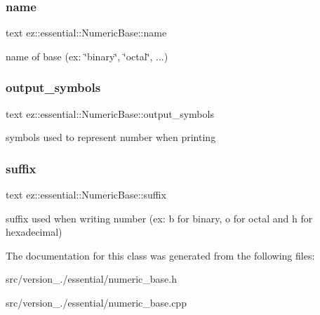 \subsubsection{\texorpdfstring{name}{name}}
{\footnotesize\ttfamily text ez\+::essential\+::\+Numeric\+Base\+::name}

name of base (ex\+: \char`\"{}binary\char`\"{}, \char`\"{}octal\char`\"{}, ...) \mbox{\label{classez_1_1essential_1_1NumericBase_a42db2f729893765e4e9a5a1085085e5d}} 
\subsubsection{\texorpdfstring{output\+\_\+symbols}{output\_symbols}}
{\footnotesize\ttfamily text ez\+::essential\+::\+Numeric\+Base\+::output\+\_\+symbols}

symbols used to represent number when printing \mbox{\label{classez_1_1essential_1_1NumericBase_a3a30796f5294fc6d0b4d2d248ea51cf3}} 
\subsubsection{\texorpdfstring{suffix}{suffix}}
{\footnotesize\ttfamily text ez\+::essential\+::\+Numeric\+Base\+::suffix}

suffix used when writing number (ex\+: \textquotesingle{}b\textquotesingle{} for binary, \textquotesingle{}o\textquotesingle{} for octal and \textquotesingle{}h\textquotesingle{} for hexadecimal) 

The documentation for this class was generated from the following files\+:\begin{DoxyCompactItemize}
\item 
src/version\+\_./essential/numeric\+\_\+base.\+h\item 
src/version\+\_./essential/numeric\+\_\+base.\+cpp\end{DoxyCompactItemize}
